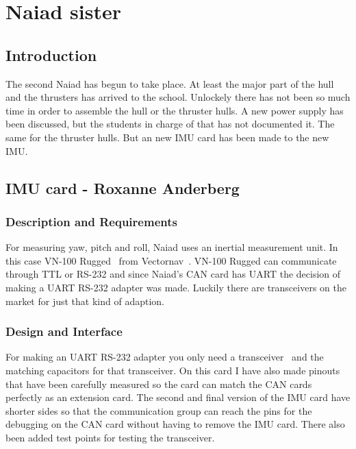 

\section{Naiad sister}
\label{sec:Naiadsister}
\subsection{Introduction}
The second Naiad has begun to take place. At least the major part of the hull and the thrusters has arrived to the school. Unlockely there has not been so much time in order to assemble the hull or the thruster hulls. A new power supply has been discussed, but the students in charge of that has not documented it. The same for the thruster hulls. But an new IMU card has been made to the new IMU.

\subsection{IMU card - Roxanne Anderberg}
\subsubsection{Description and Requirements}
For measuring yaw, pitch and roll, Naiad uses an inertial measurement unit. In this case VN-100 Rugged~\cite{rugged} from Vectornav~\cite{vectornav}.
VN-100 Rugged can communicate through TTL or RS-232 and since Naiad's CAN card has UART the decision of making a UART RS-232 adapter was made. Luckily there are transceivers on the market for just that kind of adaption.


\subsubsection{Design and Interface}
For making an UART RS-232 adapter you only need a transceiver~\cite{max232} and the matching capacitors for that transceiver. On this card I have also made pinouts that have been carefully measured so the card can match the CAN cards perfectly as an extension card. The second and final version of the IMU card have shorter sides so that the communication group can reach the pins for the debugging on the CAN card without having to remove the IMU card. There also been added test points for testing the transceiver.



